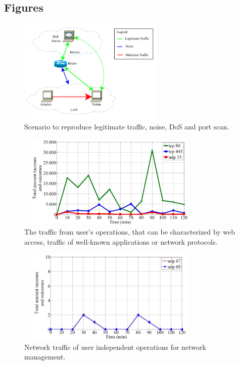 \documentclass{bmcart}
\begin{document}
\begin{backmatter}
\section*{Figures}

\begin{figure}[h!]
     \centering 
     \includegraphics[height=5cm, width=7cm]{results/figures/fig09.png}
     \caption{ Scenario to reproduce legitimate traffic, noise, DoS and port scan.}
     \label{fig:fig1}
\end{figure}

\begin{figure}[h!]
     \centering 
     \includegraphics[height=4.5cm, width=9cm]{results/figures/fig03.png}
     \caption{ The traffic from user's operations, that can be characterized by web access, traffic of well-known applications or network protocols.}
     \label{fig:fig3}
\end{figure}

\begin{figure}[h!]
     \centering 
     \includegraphics[height=4.5cm, width=9cm]{results/figures/fig04.png}
     \caption{ Network traffic of user independent operations for network management.}
     \label{fig:fig4}
\end{figure}


\end{backmatter}
\end{document}
